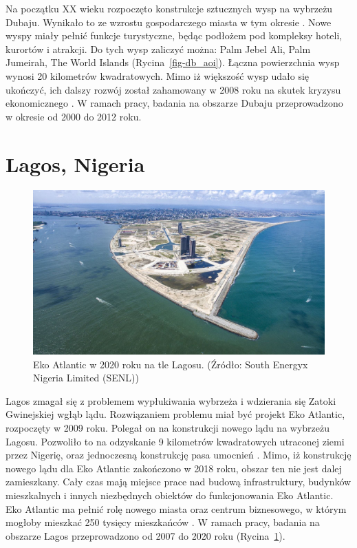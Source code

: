\documentclass{amuthesis}
\begin{document}
Na początku XX wieku rozpoczęto konstrukcje sztucznych wysp na wybrzeżu
Dubaju. Wynikało to ze wzrostu gospodarczego miasta w tym okresie
\autocite{gibling2013construction}. Nowe wyspy miały pełnić funkcje
turystyczne, będąc podłożem pod kompleksy hoteli, kurortów i atrakcji.
Do tych wysp zaliczyć można: Palm Jebel Ali, Palm Jumeirah, The World
Islands (Rycina~\ref{fig-db_aoi}). Łączna powierzchnia wysp wynosi 20
kilometrów kwadratowych. Mimo iż większość wysp udało się ukończyć, ich
dalszy rozwój został zahamowany w 2008 roku na skutek kryzysu
ekonomicznego \autocite{gupta2015futures}. W ramach pracy, badania na
obszarze Dubaju przeprowadzono w okresie od 2000 do 2012 roku.

\hypertarget{lagos-nigeria}{%
\section{Lagos, Nigeria}\label{lagos-nigeria}}

\begin{figure}[t]

{\centering \includegraphics[width=1\textwidth,height=\textheight]{figures/nigeria/nigeria_aoi.jpeg}

}

\caption{\label{fig-lg_aoi}Eko Atlantic w 2020 roku na tle Lagosu.
(Źródło: South Energyx Nigeria Limited (SENL))}

\end{figure}

Lagos zmagał się z problemem wypłukiwania wybrzeża i wdzierania się
Zatoki Gwinejskiej wgłąb lądu. Rozwiązaniem problemu miał być projekt
Eko Atlantic, rozpoczęty w 2009 roku. Polegał on na konstrukcji nowego
lądu na wybrzeżu Lagosu. Pozwoliło to na odzyskanie 9 kilometrów
kwadratowych utraconej ziemi przez Nigerię, oraz jednoczesną konstrukcję
pasa umocnień \autocite{van2012lagos}. Mimo, iż konstrukcję nowego lądu
dla Eko Atlantic zakończono w 2018 roku, obszar ten nie jest dalej
zamieszkany. Cały czas mają miejsce prace nad budową infrastruktury,
budynków mieszkalnych i innych niezbędnych obiektów do funkcjonowania
Eko Atlantic. Eko Atlantic ma pełnić rolę nowego miasta oraz centrum
biznesowego, w którym mogłoby mieszkać 250 tysięcy mieszkańców
\autocite{omotosho2013new}. W ramach pracy, badania na obszarze Lagos
przeprowadzono od 2007 do 2020 roku (Rycina~\ref{fig-lg_aoi}).
\end{document}
